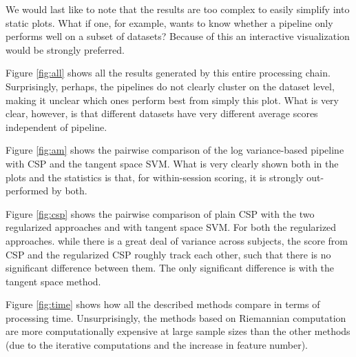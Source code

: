 We would last like to note that the results are too complex to easily
simplify into static plots. What if one, for example, wants to know
whether a pipeline only performs well on a subset of datasets? Because
of this an interactive visualization would be strongly preferred.

Figure \ref{fig:all} shows all the results generated by this entire
processing chain. Surprisingly, perhaps, the pipelines do not clearly
cluster on the dataset level, making it unclear which ones perform
best from simply this plot. What is very clear, however, is that
different datasets have very different average scores
independent of pipeline.

Figure \ref{fig:am} shows the pairwise comparison of the log
variance-based pipeline with CSP and the tangent space SVM. What is
very clearly shown both in the plots and the statistics is that, for
within-session scoring, it is strongly out-performed by both.

Figure \ref{fig:csp} shows the pairwise comparison of 
plain CSP with the two regularized approaches and with
tangent space SVM. For both the regularized approaches. while there is
a great deal of variance across subjects, the score from CSP and the
regularized CSP roughly track each other, such that there is no
significant difference between them. The only significant difference
is with the tangent space method.

Figure \ref{fig:time} shows how all the described methods compare in
terms of processing time. Unsurprisingly, the methods based on
Riemannian computation are more computationally expensive at large
sample sizes than the other methods (due to the iterative computations
and the increase in feature number). 

